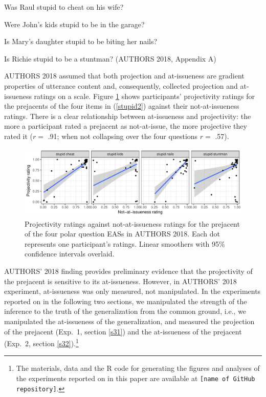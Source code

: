 \documentclass[11pt,fleqn]{article}
\newcommand{\6}{\mbox{$[\hspace*{-.6mm}[$}}
\newcommand{\9}{\mbox{$]\hspace*{-.6mm}]$}}
\begin{document}
\begin{exe}
\ex\label{stupid2}

\begin{xlist}

\ex Was Raul stupid to cheat on his wife?

\ex Were John's kids stupid to be in the garage?

\ex Is Mary's daughter stupid to be biting her nails?

\ex Is Richie stupid to be a stuntman? \hfill (AUTHORS 2018, Appendix A)

\end{xlist}

\end{exe}
AUTHORS 2018 assumed that both projection and at-issueness are gradient properties of utterance content and, consequently, collected projection and at-issueness ratings on a scale. Figure \ref{f-corr} shows participants' projectivity ratings for the prejacents of the four items in (\ref{stupid2}) against their not-at-issueness ratings. There is a clear relationship between at-issueness and projectivity: the more a participant rated a prejacent as not-at-issue, the more projective they rated it ($r =$ .91; when not collapsing over the four questions $r =$ .57). 

\begin{figure}[h!]
\centering

\includegraphics[width=1\textwidth]{figures/Exp1a-subject-projai-stupid}

\caption{Projectivity ratings against not-at-issueness ratings for the prejacent of the four polar question EASs in AUTHORS 2018. Each dot represents one participant's ratings. Linear smoothers with 95\% confidence intervals overlaid.}
\label{f-corr}
\end{figure}
AUTHORS' 2018 finding provides preliminary evidence that the projectivity of the prejacent is sensitive to its at-issueness. However, in AUTHORS' 2018 experiment, at-issueness was only measured, not manipulated. In the experiments reported on in the following two sections, we manipulated the strength of the inference to the truth of the generalization from the common ground, i.e., we manipulated the at-issueness of the generalization, and measured the projection of the prejacent (Exp.~1, section \ref{s31}) and the at-issueness of the prejacent (Exp.~2, section \ref{s32}).\footnote{\label{f-git}The
materials, data and the R code for generating the figures and analyses of the experiments reported on in this paper are available at {\tt [name of GitHub repository]}.}
\end{document}
